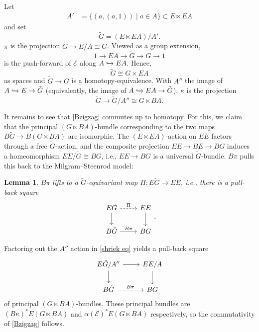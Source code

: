\documentclass[12 pt]{article}
\newtheorem{lemma}[theorem]{Lemma}
\theoremstyle{definition}
\newcommand{\calE}{\mathcal{E}}
\newcommand{\inc}{\xhookrightarrow{}}
\begin{document}
Let
\begin{align*}
A'&=\{(a,(a,1))\mid a\in A\}\subset E\ltimes EA
\end{align*}
and set
$$\tilde G=(E\ltimes EA)/A'.$$
$\pi$ is the projection $\tilde G\to E/A\cong G$. Viewed as a group extension,
$$1\to EA\to\tilde{G}\to G\to 1$$
is the push-forward of $\calE$ along $A\inc EA$. Hence,
\begin{equation}\label{tilde G}
\tilde G\cong G\times EA
\end{equation}
as spaces and $\tilde G\to G$ is a homotopy-equivalence. With $A''$ the image of $A\inc E\to \tilde G$ (equivalently, the image of $A\inc EA\to \tilde G$), $\kappa$ is the projection
\begin{equation}\label{second arrow}
\tilde G\to \tilde G/A''\cong G\ltimes BA.
\end{equation}

It remains to see that \eqref{Bzigzag} commutes up to homotopy. For this, we claim that the principal $(G\ltimes BA)$-bundle corresponding to the two maps $B\tilde G\to B(G\ltimes BA)$ are isomorphic. The $(E\ltimes EA)$-action on $EE$ factors through a free $\tilde G$-action, and the composite projection
$EE\to BE\to BG$ induces a homeomorphism $EE/\tilde G\cong BG$, i.e., $EE\to BG$ is a universal $\tilde G$-bundle. $B\pi$ pulls this back to the Milgram--Steenrod model:

\begin{lemma}\label{shriek lemma}
$B\pi$ lifts to a $\tilde G$-equivariant map $\Pi:E\tilde G\to EE$, i.e., there is a pull-back square
\begin{equation}\label{shriek eq}
\begin{tikzcd}
E\tilde G \arrow[d] \arrow[r, "\Pi", dashed] & EE \arrow[d] \\
B\tilde G \arrow[r, "B\pi"]                  & BG          
\end{tikzcd}.
\end{equation}
\end{lemma}
Factoring out the $A''$ action in \eqref{shriek eq} yields a pull-back square
$$\begin{tikzcd}
E\tilde G/A'' \arrow[d] \arrow[r] & EE/A \arrow[d] \\
B\tilde G \arrow[r, "B\pi"]                  & BG          
\end{tikzcd}$$
of principal $(G\ltimes BA)$-bundles. These principal bundles are $(B\kappa)^\ast E(G\ltimes BA)$ and $\alpha(\calE)^\ast E(G\ltimes BA)$ respectively, so the commutativity of \eqref{Bzigzag} follows.
\end{document}
